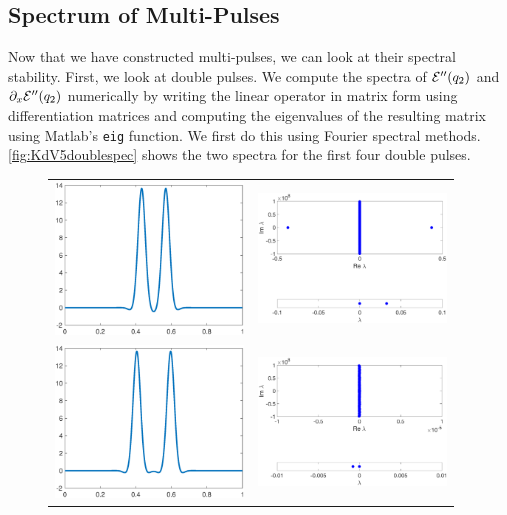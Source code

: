 \documentclass[thesis.tex]{subfiles}
\begin{document}
\subsection{Spectrum of Multi-Pulses}

Now that we have constructed multi-pulses, we can look at their spectral stability. First, we look at double pulses. We compute the spectra of $\mathcal{E}''(q_2)$ and $\partial_x \mathcal{E}''(q_2)$ numerically by writing the linear operator in matrix form using differentiation matrices and computing the eigenvalues of the resulting matrix using Matlab's \texttt{eig} function. We first do this using Fourier spectral methods. \cref{fig:KdV5doublespec} shows the two spectra for the first four double pulses.

\begin{figure}[H]
\begin{center}
\begin{tabular}{cc}
\includegraphics[width=5cm]{images/kdv5numerics/double1} &
\includegraphics[width=5cm]{images/kdv5numerics/double1spec} \\
\includegraphics[width=5cm]{images/kdv5numerics/double2} &
\includegraphics[width=5cm]{images/kdv5numerics/double2spec} \\

\end{tabular}
\end{center}
\end{figure}
\end{document}
